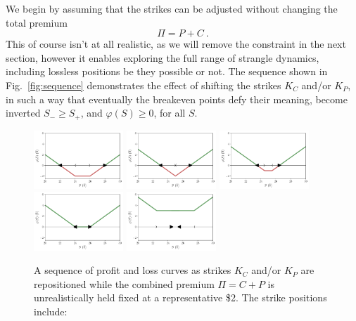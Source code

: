 \documentclass[aps,reprint]{revtex4-2}
\begin{document}
We begin by assuming that the strikes can be adjusted without changing the total premium 
\begin{equation}
\Pi = P + C~.
\end{equation}
This of course isn't at all realistic, as we will remove the constraint in the next section, however it enables 
exploring the full range of strangle dynamics, including lossless positions be they possible or not.
The sequence shown in Fig.~\ref{fig:sequence} demonstrates the effect of shifting the strikes $K_C$ and/or $K_P$,  in such a way that eventually the breakeven points defy their meaning, become inverted $S_- \geq S_+$, and $\varphi(S) \geq 0$, for all $S$.
\begin{figure}[htb]
    \centering
    \includegraphics[width=0.3\textwidth]{figs/sequence1.pdf}
    \includegraphics[width=0.3\textwidth]{figs/sequence2.pdf}
    \includegraphics[width=0.3\textwidth]{figs/sequence3.pdf}
    \includegraphics[width=0.3\textwidth]{figs/sequence4.pdf}
    \includegraphics[width=0.3\textwidth]{figs/sequence5.pdf}
\caption{
    A sequence of profit and loss curves as strikes $K_C$ and/or $K_P$ are repositioned while the combined premium $\Pi = C+P$ is unrealistically held fixed at a representative \$2. The strike positions include:
}
\end{figure}
\end{document}
